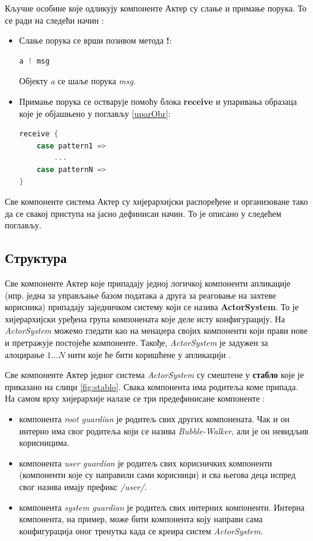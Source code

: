 \documentclass[12pt,oneside]{memoir}
\begin{document}
Кључне особине које одликују компоненте Актер су слање и примање порука. То се ради на следећи начин \cite{progInScala3}: 
\begin{itemize}
\item Слање порука се врши позивом метода \textbf{!}:
\begin{lstlisting}[language=Scala]
a ! msg
\end{lstlisting}
Објекту \textit{a} се шаље порука \textit{msg}.
\item Примање порука се остварује помоћу блока \textbf{receive} и упаривања образаца које је објашњено у поглављу \ref{uparObr}:
\begin{lstlisting}[language=Scala]
receive {
	case pattern1 => 
		...
	case patternN => 
}
\end{lstlisting}
\end{itemize}

Све компоненте система Актер су хијерархијски распоређене и организоване тако да се свакој приступа на јасно дефинисан начин. То је описано у следећем поглављу.

\subsection{Структура}
\label{subsec:struktura}

Све компоненте Актер које припадају једној логичкој компоненти апликације (нпр. једна за управљање базом података а друга за реаговање на захтеве корисника) припадају заједничком систему који се назива \textbf{ActorSystem}. То је хијерархијски уређена група компонената које деле исту конфигурацију. На \textit{ActorSystem} можемо гледати као на менаџера својих компоненти који прави нове и претражује постојеће компоненте. Такође, \textit{ActorSystem} је задужен за алоцирање $1...N$ нити које ће бити коришћене у апликацији \cite{progInScala3, akkaDoc}.

Све компоненте Актер једног система \textit{ActorSystem} су смештене у \textbf{стабло} које је приказано на слици \ref{fig:stablo}. Свака компонента има родитеља коме припада. На самом врху хијерархије налазе се три предефинисане компоненте \cite{akkaDoc}:
\begin{itemize}
\item компонента \textit{root guardian} је родитељ свих других компонената. Чак и он интерно има свог родитеља који се назива \textit{Bubble-Walker}, али је он невидљив корисницима.
\item компонента \textit{user guardian} је родитељ свих корисничких компоненти (компоненти које су направили сами корисници) и сва његова деца испред свог назива имају префикс \textit{/user/}.
\item компонента \textit{system guardian} је родитељ свих интерних компоненти. Интерна компонента, на пример, може бити компонента коју направи сама конфигурација оног тренутка када се креира систем \textit{ActorSystem}. 
\end{itemize}
\end{document}
